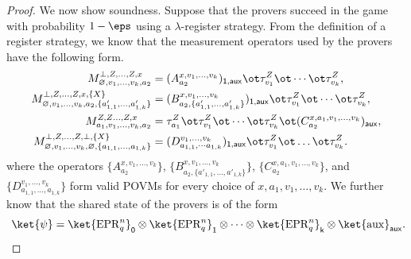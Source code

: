 \documentclass[11pt]{article}
\newcommand{\reg}[1]{{\mathsf{#1}}}
\begin{document}
\begin{proof}
    We now show soundness. Suppose that the provers succeed in the game
    with probability $1 - \eps$ using a $\lambda$-register
    strategy. From the definition of a register strategy, we know that the measurement operators
    used by the provers have the following form.
    \begin{align*}
      M^{\bot, Z, \dots, Z, x}_{\varnothing, v_1, \dots, v_k, a_2} &=
      (A^{x, v_1, \dots, v_k}_{a_2})_{\reg{1, aux}} \ot \tau^Z_{v_1}
                                                                     \ot \cdots \ot \tau^Z_{v_k}, \\
      M^{\bot, Z, \dots, Z, x, \{X\}}_{\varnothing, v_1, \dots, v_k,
      a_2, \{a'_{1,1}, \dots, a'_{1,k}\}} &= (B^{x, v_1, \dots,
      v_k}_{a_2, \{a'_{1,1}, \dots, a'_{1,k}\}})_{\reg{1,aux}}
                                            \ot \tau^Z_{v_1} \ot \cdots  \ot \tau^Z_{v_k}, \\
      M^{Z, Z \dots, Z, x}_{a_1, v_1, \ldots, v_k, a_2} &= \tau^Z_{a_1}
                                                         \ot
                                                         \tau^Z_{v_1} \ot
                                                         \cdots \ot
                                                         \tau^Z_{v_k}
                                                         \ot (C^{x,
                                                         a_1, v_1,
                                                          \dots,
                                                          v_k}_{a_2})_{\reg{aux}},\\
      M^{\bot, Z, \dots, Z, \bot, \{X\}}_{\varnothing, v_1, \dots,
      v_k, \varnothing, \{a_{1,1}, \dots, a_{1,k}\}} &=  (D^{v_1,
                                                       \dots, v_k}_{a_{1,1},
                                                       \dotsm
                                                       a_{1,k}})_{\reg{1,aux}}
                                                       \ot
                                                       \tau^Z_{v_1}
                                                       \ot \dots \ot \tau^Z_{v_k}.
    \end{align*}
    where the operators $\{A^{x, v_1, \dots, v_k}_{a_2}\}$,
    $\{B^{x, v_1, \dots, v_k}_{a_2, \{a'_{1,1}, \dots, a'_{1,k}\}}\}$,
    $\{C^{x, a_1, v_1, \ldots, v_k}_{a_2}\}$, and $\{D^{v_1, \dots,
      v_k}_{a_{1,1}, \dots, a_{1,k}}\}$ form
    valid POVMs for every choice of $x, a_1, v_1, \dots, v_k$. We further
    know that the shared state of the provers is of the form
    \[ \
\ket{\psi}
=
\ket{\mathrm{EPR}_q^n}_{\reg{0}}
\otimes \ket{\mathrm{EPR}_q^n}_{\reg{1}}
\otimes
\cdots
\otimes
\ket{\mathrm{EPR}_q^n}_{\reg{k}}
\otimes
\ket{\mathrm{aux}}_{\reg{aux}}. \]


\end{proof}
\end{document}

